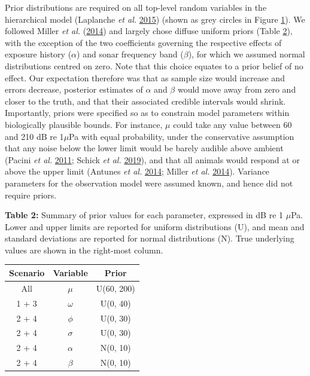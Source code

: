 \documentclass[
]{article}
\begin{document}
Prior distributions are required on all top-level random variables in the hierarchical model (Laplanche \emph{et al.} \protect\hyperlink{ref-Laplanche2015}{2015}) (shown as grey circles in Figure \hyperlink{fig1}{1}). We followed Miller \emph{et al.} (\protect\hyperlink{ref-Miller2014}{2014}) and largely chose diffuse uniform priors (Table \hyperlink{tab2}{2}), with the exception of the two coefficients governing the respective effects of exposure history (\(\alpha\)) and sonar frequency band (\(\beta\)), for which we assumed normal distributions centred on zero. Note that this choice equates to a prior belief of no effect. Our expectation therefore was that as sample size would increase and errors decrease, posterior estimates of \(\alpha\) and \(\beta\) would move away from zero and closer to the truth, and that their associated credible intervals would shrink. Importantly, priors were specified so as to constrain model parameters within biologically plausible bounds. For instance, \(\mu\) could take any value between 60 and 210 dB re 1\(\mu\)Pa with equal probability, under the conservative assumption that any noise below the lower limit would be barely audible above ambient (Pacini \emph{et al.} \protect\hyperlink{ref-Pacini2011}{2011}; Schick \emph{et al.} \protect\hyperlink{ref-Schick2019}{2019}), and that all animals would respond at or above the upper limit (Antunes \emph{et al.} \protect\hyperlink{ref-Antunes2014}{2014}; Miller \emph{et al.} \protect\hyperlink{ref-Miller2014}{2014}). Variance parameters for the observation model were assumed known, and hence did not require priors.

\textbf{Table 2:} \hypertarget{tab2}{}Summary of prior values for each parameter, expressed in dB re 1 \(\mu\)Pa. Lower and upper limits are reported for uniform distributions (U), and mean and standard deviations are reported for normal distributions (N). True underlying values are shown in the right-most column.

\renewcommand{\arraystretch}{1.1}
\begin{table}[H]
\centering
\begin{tabular}{ccc}
\toprule
\textbf{Scenario} & \textbf{Variable} & \textbf{Prior}\\
\midrule
\rowcolor{gray!6}  All & $\mu$ & U(60, 200)\\
1 + 3 & $\omega$ & U(0, 40)\\
\rowcolor{gray!6}  2 + 4 & $\phi$ & U(0, 30)\\
2 + 4 & $\sigma$ & U(0, 30)\\
\rowcolor{gray!6}  2 + 4 & $\alpha$ & N(0, 10)\\
2 + 4 & $\beta$ & N(0, 10)\\
\bottomrule
\end{tabular}
\end{table}
\end{document}
